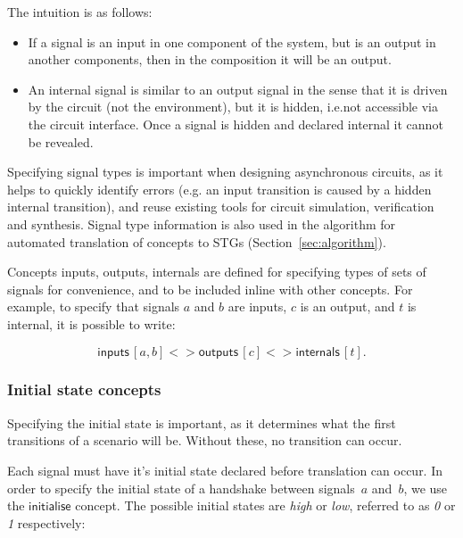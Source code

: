 \documentclass[british,conference,compsoc]{IEEEtran}
\begin{document}
The intuition is as follows:
\begin{itemize}
    \item If a signal is an input in one component of the system, but is an
    output in another components, then in the composition it will be an output.
    \item An internal signal is similar to an output signal in the sense
that it is driven by the circuit (not the environment), but it is hidden, 
i.e.not accessible via the circuit interface. Once a signal is hidden and 
declared internal it cannot be revealed.
\end{itemize}

\noindent Specifying signal types is important when designing asynchronous
circuits, as it helps to quickly identify errors (e.g. an input transition is
caused by a hidden internal transition), and reuse existing tools for circuit
simulation, verification and synthesis. Signal type information is also used
in the algorithm for automated translation of concepts to
STGs (Section~\ref{sec:algorithm}).

Concepts \textsf{inputs}, \textsf{outputs}, \textsf{internals} are defined for
specifying types of sets of signals for convenience, and to be included inline 
with other concepts. For example, to specify that signals $a$ and $b$ are 
inputs, $c$ is an output, and $t$ is internal, it is possible to write:

\vspace{-4mm}

\[
\mathsf{inputs}\,[a, b] <> \mathsf{outputs}\,[c] <>
\mathsf{internals}\,[t].
\]

\vspace{-4mm}

\subsubsection{Initial state concepts\label{sub:initState}}

Specifying the initial state is important, as it determines what the first 
transitions of a scenario will be. Without these, no transition can occur.

Each signal must have it's initial state declared before translation can occur. 
In order to specify the initial state of a handshake between signals~$a$
and~$b$, we use the $\mathsf{initialise}$ concept.
The possible initial states are \emph{high} or \emph{low}, referred to as 
\emph{0} or \emph{1} respectively:

\vspace{-2mm}
\end{document}
